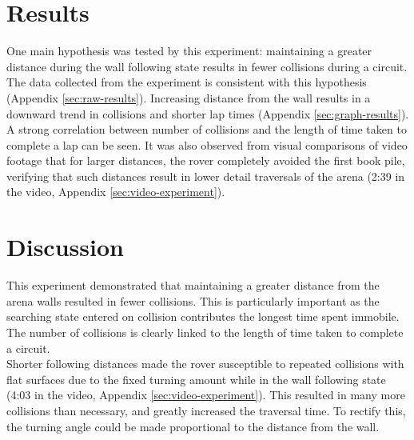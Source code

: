 \documentclass[a4paper,12pt,twocolumn]{article}
\begin{document}
\section{Results}
One main hypothesis was tested by this experiment: maintaining a greater distance during the wall following state results in fewer collisions during a circuit.
The data collected from the experiment is consistent with this hypothesis (Appendix \ref{sec:raw-results}). Increasing distance from the wall results in a downward trend in collisions and shorter lap times (Appendix \ref{sec:graph-results}). A strong correlation between number of collisions and the length of time taken to complete a lap can be seen. It was also observed from visual comparisons of video footage that for larger distances, the rover completely avoided the first book pile, verifying that such distances result in lower detail traversals of the arena (2:39 in the video, Appendix \ref{sec:video-experiment}). 

\section{Discussion}
This experiment demonstrated that maintaining a greater distance from the arena walls resulted in fewer collisions. This is particularly important as the searching state entered on collision contributes the longest time spent immobile. The number of collisions is clearly linked to the length of time taken to complete a circuit.\\

Shorter following distances made the rover susceptible to repeated collisions with flat surfaces due to the fixed turning amount while in the wall following state (4:03 in the video, Appendix \ref{sec:video-experiment}). This resulted in many more collisions than necessary, and greatly increased the traversal time. To rectify this, the turning angle could be made proportional to the distance from the wall.
\end{document}
